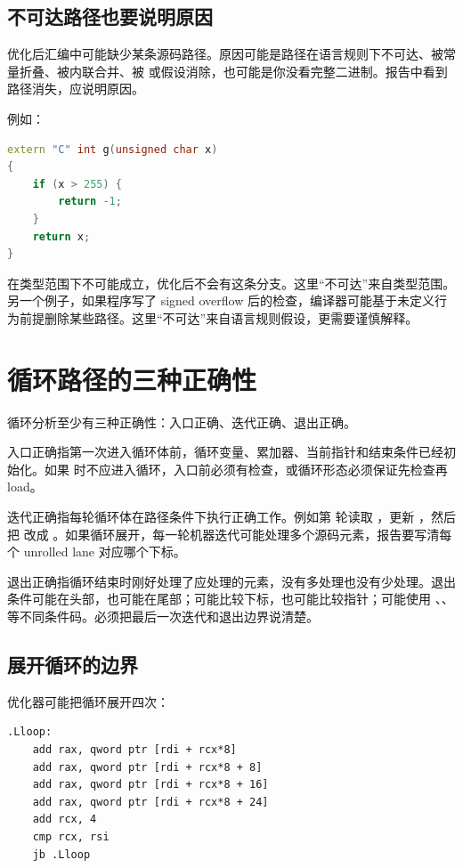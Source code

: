 \subsection{不可达路径也要说明原因}

优化后汇编中可能缺少某条源码路径。原因可能是路径在语言规则下不可达、被常量折叠、被内联合并、被  或假设消除，也可能是你没看完整二进制。报告中看到路径消失，应说明原因。

例如：

\begin{lstlisting}[language=C++]
extern "C" int g(unsigned char x)
{
    if (x > 255) {
        return -1;
    }
    return x;
}
\end{lstlisting}

 在类型范围下不可能成立，优化后不会有这条分支。这里“不可达”来自类型范围。另一个例子，如果程序写了 signed overflow 后的检查，编译器可能基于未定义行为前提删除某些路径。这里“不可达”来自语言规则假设，更需要谨慎解释。

\section{循环路径的三种正确性}

循环分析至少有三种正确性：入口正确、迭代正确、退出正确。

入口正确指第一次进入循环体前，循环变量、累加器、当前指针和结束条件已经初始化。如果  时不应进入循环，入口前必须有检查，或循环形态必须保证先检查再 load。

迭代正确指每轮循环体在路径条件下执行正确工作。例如第  轮读取 ，更新 ，然后把  改成 。如果循环展开，每一轮机器迭代可能处理多个源码元素，报告要写清每个 unrolled lane 对应哪个下标。

退出正确指循环结束时刚好处理了应处理的元素，没有多处理也没有少处理。退出条件可能在头部，也可能在尾部；可能比较下标，也可能比较指针；可能使用 、、 等不同条件码。必须把最后一次迭代和退出边界说清楚。

\subsection{展开循环的边界}

优化器可能把循环展开四次：

\begin{lstlisting}
.Lloop:
    add rax, qword ptr [rdi + rcx*8]
    add rax, qword ptr [rdi + rcx*8 + 8]
    add rax, qword ptr [rdi + rcx*8 + 16]
    add rax, qword ptr [rdi + rcx*8 + 24]
    add rcx, 4
    cmp rcx, rsi
    jb .Lloop
\end{lstlisting}

